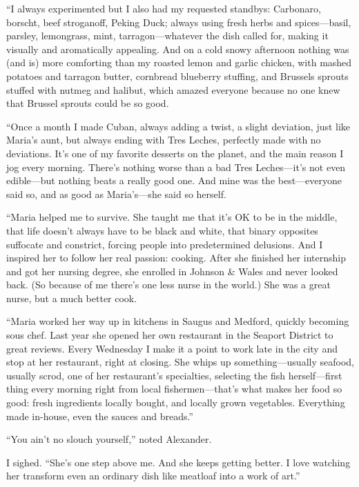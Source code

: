 ``I always experimented but I also had my requested standbys: Carbonaro,
borscht, beef stroganoff, Peking Duck; always using fresh herbs and
spices---basil, parsley, lemongrass, mint, tarragon---whatever the dish
called for, making it visually and aromatically appealing. And on a cold
snowy afternoon nothing was (and is) more comforting than my roasted
lemon and garlic chicken, with mashed potatoes and tarragon butter,
cornbread blueberry stuffing, and Brussels sprouts stuffed with nutmeg
and halibut, which amazed everyone because no one knew that Brussel
sprouts could be so good.

``Once a month I made Cuban, always adding a twist, a slight deviation,
just like Maria's aunt, but always ending with Tres Leches, perfectly
made with no deviations. It's one of my favorite desserts on the planet,
and the main reason I jog every morning. There's nothing worse than a
bad Tres Leches---it's not even edible---but nothing beats a really good
one. And mine was the best---everyone said so, and as good as
Maria's---she said so herself.

``Maria helped me to survive. She taught me that it's OK to be in the
middle, that life doesn't always have to be black and white, that binary
opposites suffocate and constrict, forcing people into predetermined
delusions. And I inspired her to follow her real passion: cooking. After
she finished her internship and got her nursing degree, she enrolled in
Johnson \& Wales and never looked back. (So because of me there's one
less nurse in the world.) She was a great nurse, but a much better cook.

``Maria worked her way up in kitchens in Saugus and Medford, quickly
becoming sous chef. Last year she opened her own restaurant in the
Seaport District to great reviews. Every Wednesday I make it a point to
work late in the city and stop at her restaurant, right at closing. She
whips up something---usually seafood, usually scrod, one of her
restaurant's specialties, selecting the fish herself---first thing every
morning right from local fishermen---that's what makes her food so good:
fresh ingredients locally bought, and locally grown vegetables.
Everything made in-house, even the sauces and breads.''

``You ain't no slouch yourself,'' noted Alexander.

I sighed. ``She's one step above me. And she keeps getting better. I
love watching her transform even an ordinary dish like meatloaf into a
work of art.''

